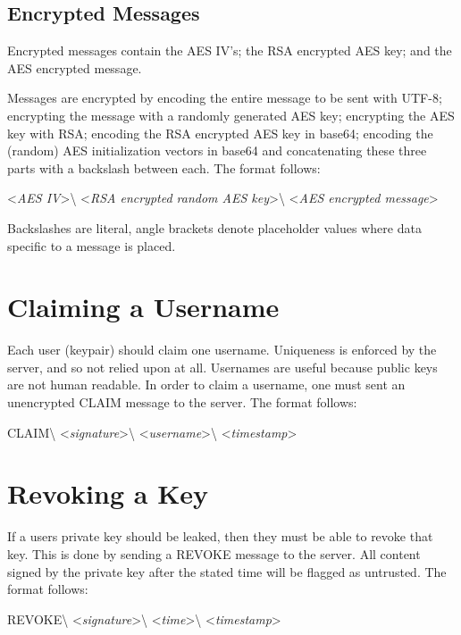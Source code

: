\subsection{Encrypted Messages}
Encrypted messages contain the AES IV's; the RSA encrypted AES key; and the AES
encrypted message.

Messages are encrypted by encoding the entire message to be sent with UTF-8;
encrypting the message with a randomly generated AES key; encrypting the AES key
with RSA; encoding the RSA encrypted AES key in base64; encoding the (random)
AES initialization vectors in base64 and concatenating these three parts with a
backslash between each. The format follows:

\begin{center}
\textless \textit{AES IV}\textgreater\textbackslash
\textless \textit{RSA encrypted random AES key}\textgreater\textbackslash
\textless \textit{AES encrypted message}\textgreater
\end{center}

Backslashes are literal, angle brackets denote placeholder values where data
specific to a message is placed.

\section{Claiming a Username}
Each user (keypair) should claim one username. Uniqueness is enforced by the
server, and so not relied upon at all. Usernames are useful because public keys
are not human readable. In order to claim a username, one must sent an
unencrypted CLAIM message to the server. The format follows:

\begin{center}
CLAIM\textbackslash
\textless \textit{signature}\textgreater\textbackslash
\textless \textit{username}\textgreater\textbackslash
\textless \textit{timestamp}\textgreater
\end{center}

\section{Revoking a Key}
If a users private key should be leaked, then they must be able to revoke that
key. This is done by sending a REVOKE message to the server. All content signed
by the private key after the stated time will be flagged as untrusted. The
format follows:

\begin{center}
REVOKE\textbackslash
\textless \textit{signature}\textgreater\textbackslash
\textless \textit{time}\textgreater\textbackslash
\textless \textit{timestamp}\textgreater
\end{center}

